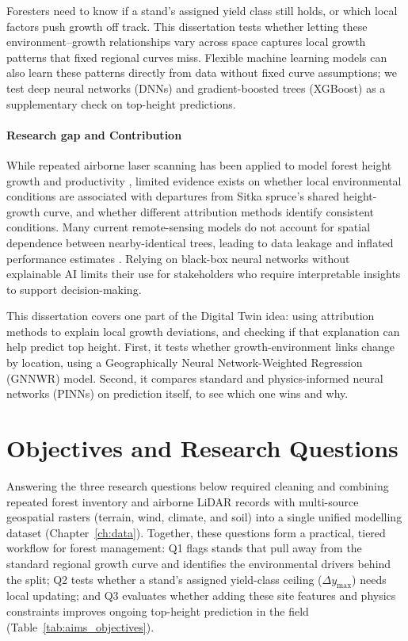 \documentclass[logo,msc,ai]{infthesis}           %
\begin{document}
Foresters need to know if a stand's assigned yield class still holds, or which local factors push growth off track. This dissertation tests whether letting these environment--growth relationships vary across space captures local growth patterns that fixed regional curves miss. Flexible machine learning models can also learn these patterns directly from data without fixed curve assumptions; we test deep neural networks (DNNs) and gradient-boosted trees (XGBoost) as a supplementary check on top-height predictions.

\paragraph*{Research gap and Contribution}
While repeated airborne laser scanning has been applied to model forest height growth and productivity \cite{janiec2023Development_C1_SS}, limited evidence exists on whether local environmental conditions are associated with departures from Sitka spruce's shared height-growth curve, and whether different attribution methods identify consistent conditions. Many current remote-sensing models do not account for spatial dependence between nearby-identical trees, leading to data leakage and inflated performance estimates \cite{Karasiak2022Spatial_C5_EVAL, ploton2020Spatial_C5_EVAL, lynch2025Digital_C4_NN}. Relying on black-box neural networks without explainable AI limits their use for stakeholders who require interpretable insights to support decision-making.

This dissertation covers one part of the Digital Twin idea: using attribution methods to explain local growth deviations, and checking if that explanation can help predict top height. First, it tests whether growth-environment links change by location, using a Geographically Neural Network-Weighted Regression (GNNWR) model. Second, it compares standard and physics-informed neural networks (PINNs) on prediction itself, to see which one wins and why.

\section{Objectives and Research Questions}

Answering the three research questions below required cleaning and combining repeated forest inventory and airborne LiDAR records with multi-source geospatial rasters (terrain, wind, climate, and soil) into a single unified modelling dataset (Chapter~\ref{ch:data}). Together, these questions form a practical, tiered workflow for forest management: Q1 flags stands that pull away from the standard regional growth curve and identifies the environmental drivers behind the split; Q2 tests whether a stand's assigned yield-class ceiling ($\Delta y_{\max}$) needs local updating; and Q3 evaluates whether adding these site features and physics constraints improves ongoing top-height prediction in the field (Table~\ref{tab:aims_objectives}).
\end{document}
